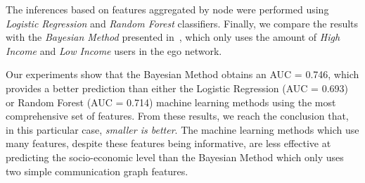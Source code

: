 \documentclass[conference]{IEEEtran}
\begin{document}
The inferences based on features aggregated by node were performed using \emph{Logistic Regression} and \emph{Random Forest} classifiers.
Finally, we compare the results with the \emph{Bayesian Method} presented in~\cite{fixmanasonam2016}, which only uses the amount of \emph{High Income} and \emph{Low Income} users in the ego network. 

Our experiments show that the Bayesian Method obtains an AUC = 0.746, which provides a better prediction than either the Logistic Regression (AUC = 0.693) or Random Forest (AUC = 0.714) machine learning methods using the most comprehensive set of features. 
From these results, we reach the conclusion that, in this particular case, \emph{smaller is better}. The {machine learning} methods which use many features, despite these features being informative,  are less effective at predicting the socio-economic level than the Bayesian Method which only uses two simple communication graph features.


{}
\end{document}

